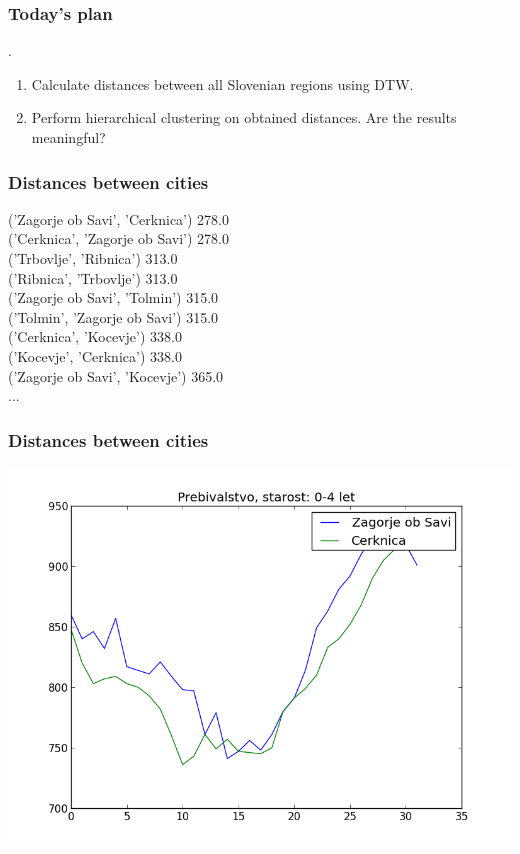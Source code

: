 \documentclass{beamer}
\begin{document}
\begin{frame}
	\frametitle{Today's plan}.
	\begin{enumerate}
		\item Calculate distances between all Slovenian regions using DTW. 
		\item Perform hierarchical clustering on obtained distances. Are the results meaningful?
	\end{enumerate}
\end{frame}


\begin{frame}
	\frametitle{Distances between cities}
	
('Zagorje ob Savi', 'Cerknica') 278.0  \\
('Cerknica', 'Zagorje ob Savi') 278.0 \\
('Trbovlje', 'Ribnica') 313.0 \\
('Ribnica', 'Trbovlje') 313.0 \\
('Zagorje ob Savi', 'Tolmin') 315.0 \\ 
('Tolmin', 'Zagorje ob Savi') 315.0 \\
('Cerknica', 'Kocevje') 338.0 \\
('Kocevje', 'Cerknica') 338.0 \\
('Zagorje ob Savi', 'Kocevje') 365.0\\ 
... \\ 

\end{frame} 

\begin{frame}
	\frametitle{Distances between cities}
	\includegraphics[scale=0.50]{../results/primerjava_0-4_let.png}
\end{frame} 
\end{document}
